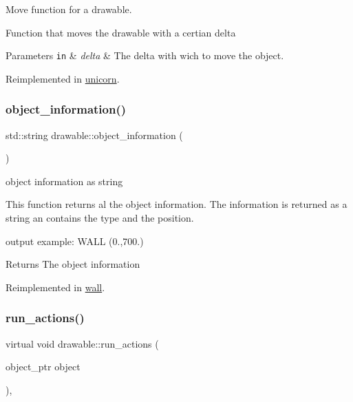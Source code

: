 Move function for a drawable. 

Function that moves the drawable with a certian delta


\begin{DoxyParams}[1]{Parameters}
\mbox{\tt in}  & {\em delta} & The delta with wich to move the object. \\
\hline
\end{DoxyParams}


Reimplemented in \hyperlink{classunicorn_a162f200a68342f7bc0baaf17c8cf3f9f}{unicorn}.

\mbox{\label{classdrawable_a2ed0f8bb53f33477f7722efa7bb24583}} 
\subsubsection{\texorpdfstring{object\+\_\+information()}{object\_information()}}
{\footnotesize\ttfamily std\+::string drawable\+::object\+\_\+information (\begin{DoxyParamCaption}{ }\end{DoxyParamCaption})\hspace{0.3cm}{\ttfamily [virtual]}}



object information as string 

This function returns al the object information. The information is returned as a string an contains the type and the position.

output example\+: W\+A\+LL (0.,700.) \begin{DoxyReturn}{Returns}
The object information 
\end{DoxyReturn}


Reimplemented in \hyperlink{classwall_aab1de4f144f176b134a967ba08747932}{wall}.

\mbox{\label{classdrawable_a715df01a318331e5611a2b0ad30109ff}} 
\subsubsection{\texorpdfstring{run\+\_\+actions()}{run\_actions()}}
{\footnotesize\ttfamily virtual void drawable\+::run\+\_\+actions (\begin{DoxyParamCaption}\item[{object\+\_\+ptr}]{object }\end{DoxyParamCaption})\hspace{0.3cm}{\ttfamily [inline]}, {\ttfamily [virtual]}}



